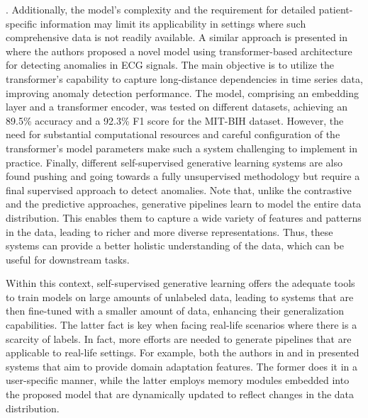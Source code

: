 . Additionally, the model's complexity and the requirement for detailed patient-specific information may limit its applicability in settings where such comprehensive data is not readily available. A similar approach is presented in \cite{alamr2023unsupervised} where the authors proposed a novel model using transformer-based architecture for detecting anomalies in ECG signals. The main objective is to utilize the transformer's capability to capture long-distance dependencies in time series data, improving anomaly detection performance. The model, comprising an embedding layer and a transformer encoder, was tested on different datasets, achieving an 89.5\% accuracy and a 92.3\% F1 score for the MIT-BIH dataset. However, the need for substantial computational resources and careful configuration of the transformer's model parameters make such a system challenging to implement in practice. Finally, different self-supervised generative learning systems are also found pushing and going towards a fully unsupervised methodology \cite{dutta2021med,kite2024unlocking} but require a final supervised approach to detect anomalies. %
Note that, unlike the contrastive and the predictive approaches, generative pipelines learn to model the entire data distribution. This enables them to capture a wide variety of features and patterns in the data, leading to richer and more diverse representations. Thus, these systems can provide a better holistic understanding of the data, which can be useful for downstream tasks.

Within this context, self-supervised generative learning offers the adequate tools to train models on large amounts of unlabeled data, leading to systems that are then fine-tuned with a smaller amount of data, enhancing their generalization capabilities. The latter fact is key when facing real-life scenarios where there is a scarcity of labels. In fact, more efforts are needed to generate pipelines that are applicable to real-life settings. For example, both the authors in \cite{CARRERA2019482} and in \cite{zhang2023} presented systems that aim to provide domain adaptation features. The former does it in a user-specific manner, while the latter employs memory modules embedded into the proposed model that are dynamically updated to reflect changes in the data distribution. 


